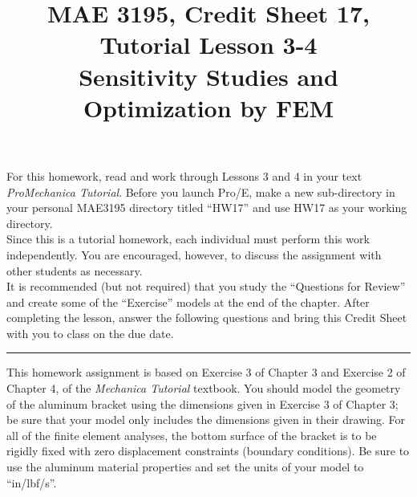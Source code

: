 \documentclass[12pt]{article}
\title{MAE 3195, Credit Sheet 17, Tutorial Lesson 3-4\\
Sensitivity Studies and Optimization by FEM}
\date{}
\begin{document}
\maketitle

For this homework, read and work through Lessons 3 and 4 in your text \textit{ProMechanica Tutorial}. Before you launch Pro/E, make a new sub-directory in your personal MAE3195 directory titled ``HW17'' and use HW17 as your working directory.\\

Since this is a tutorial homework, each individual must perform this work independently. You are encouraged, however, to discuss the assignment with other students as necessary.\\

It is recommended (but not required) that you study the ``Questions for Review'' and create some of the ``Exercise'' models at the end of the chapter. After completing the lesson, answer the following questions and bring this Credit Sheet with you to class on the due date.\vspace{.25in}

\hrule \vspace{.25in}

This homework assignment is based on Exercise 3 of Chapter 3 and Exercise 2 of Chapter 4, of the \textit{Mechanica Tutorial} textbook. You should model the geometry of the aluminum bracket using the dimensions given in Exercise 3 of Chapter 3; be sure that your model only includes the dimensions given in their drawing. For all of the finite element analyses, the bottom surface of the bracket is to be rigidly fixed with zero displacement constraints (boundary conditions). Be sure to use the aluminum material properties and set the units of your model to ``in/lbf/s''.
\end{document}
